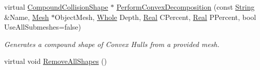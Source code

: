 \begin{DoxyCompactItemize}
virtual \hyperlink{classMezzanine_1_1CompoundCollisionShape}{CompoundCollisionShape} $\ast$ \hyperlink{classMezzanine_1_1CollisionShapeManager_ab9a17c8322a36a7d1c8ee80ff11e1662}{PerformConvexDecomposition} (const \hyperlink{namespaceMezzanine_acf9fcc130e6ebf08e3d8491aebcf1c86}{String} \&Name, \hyperlink{classMezzanine_1_1Mesh}{Mesh} $\ast$ObjectMesh, \hyperlink{namespaceMezzanine_adcbb6ce6d1eb4379d109e51171e2e493}{Whole} Depth, \hyperlink{namespaceMezzanine_a726731b1a7df72bf3583e4a97282c6f6}{Real} CPercent, \hyperlink{namespaceMezzanine_a726731b1a7df72bf3583e4a97282c6f6}{Real} PPercent, bool UseAllSubmeshes=false)
\begin{DoxyCompactList}\small\item\em Generates a compound shape of Convex Hulls from a provided mesh. \item\end{DoxyCompactList}\item 
\hypertarget{classMezzanine_1_1CollisionShapeManager_a0911f693b819bb1c32ef401893a47d1b}{
virtual void \hyperlink{classMezzanine_1_1CollisionShapeManager_a0911f693b819bb1c32ef401893a47d1b}{RemoveAllShapes} ()}
\label{classMezzanine_1_1CollisionShapeManager_a0911f693b819bb1c32ef401893a47d1b}


\end{DoxyCompactItemize}
